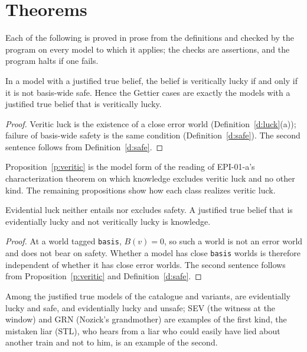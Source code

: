 \documentclass{situationist-preprint}
\begin{document}
\section{Theorems}\label{s:thm}

Each of the following is proved in prose from the definitions and checked by the program on every model to which it applies; the checks are assertions, and the program halts if one fails.

\begin{proposition}\label{p:veritic}
In a model with a justified true belief, the belief is veritically lucky if and only if it is not basis-wide safe. Hence the Gettier cases are exactly the models with a justified true belief that is veritically lucky.
\end{proposition}

\begin{proof}
Veritic luck is the existence of a close error world (Definition~\ref{d:luck}(a)); failure of basis-wide safety is the same condition (Definition~\ref{d:safe}). The second sentence follows from Definition~\ref{d:safe}.
\end{proof}

Proposition~\ref{p:veritic} is the model form of the reading of EPI-01-a's characterization theorem on which knowledge excludes veritic luck and no other kind. The remaining propositions show how each class realizes veritic luck.

\begin{proposition}\label{p:evidential}
Evidential luck neither entails nor excludes safety. A justified true belief that is evidentially lucky and not veritically lucky is knowledge.
\end{proposition}

\begin{proof}
At a world tagged \texttt{basis}, $B(v) = 0$, so such a world is not an error world and does not bear on safety. Whether a model has close \texttt{basis} worlds is therefore independent of whether it has close error worlds. The second sentence follows from Proposition~\ref{p:veritic} and Definition~\ref{d:safe}.
\end{proof}

Among the justified true models of the catalogue and variants, \stevsafe{} are evidentially lucky and safe, and \stevunsafe{} evidentially lucky and unsafe; SEV (the witness at the window) and GRN (Nozick's grandmother) are examples of the first kind, the mistaken liar (STL), who hears from a liar who could easily have lied about another train and not to him, is an example of the second.
\end{document}
